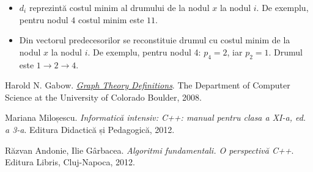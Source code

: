 \documentclass[9pt,a4paper]{report}
\begin{document}
\begin{itemize}
    \item $d_i$ reprezintă costul minim al drumului de la nodul $x$ la nodul $i$. De exemplu, pentru nodul $4$ costul minim este $11$.
    \item Din vectorul predecesorilor se reconstituie drumul cu costul minim de la nodul $x$ la nodul $i$. De exemplu, pentru nodul 4: $p_4 = 2$, iar $p_2 = 1$. Drumul este $1 \rightarrow 2 \rightarrow 4$.
\end{itemize}

\begin{thebibliography}{9}
    Harold N. Gabow.
    \href{https://www.cs.colorado.edu/~hal/Papers/DFS/alldfs.pdf}{\textit{Graph Theory Definitions}}.
    The Department of Computer Science at the University of Colorado Boulder, 2008.

    Mariana Miloșescu.
    \textit{Informatică intensiv: C++: manual pentru clasa a XI-a, ed. a 3-a}.
    Editura Didactică și Pedagogică, 2012.

    Răzvan Andonie, Ilie Gârbacea.
    \textit{Algoritmi fundamentali. O perspectivă C++}.
    Editura Libris, Cluj-Napoca, 2012.
\end{thebibliography}
\end{document}
